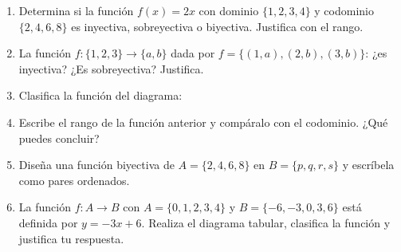 \documentclass[12pt, letterpaper]{article}
\begin{document}
\begin{enumerate}[leftmargin=*, resume]
  \item \facil{} Determina si la función $f(x) = 2x$ con dominio $\{1, 2, 3, 4\}$ y codominio $\{2, 4, 6, 8\}$ es inyectiva, sobreyectiva o biyectiva. Justifica con el rango.

  \item \facil{} La función $f: \{1, 2, 3\} \rightarrow \{a, b\}$ dada por $f = \{(1, a), (2, b), (3, b)\}$: ¿es inyectiva? ¿Es sobreyectiva? Justifica.

  \item \medio{} Clasifica la función del diagrama:
        \begin{center}
        \end{center}

  \item \medio{} Escribe el rango de la función anterior y compáralo con el codominio. ¿Qué puedes concluir?

  \item \dificil{} Diseña una función biyectiva de $A = \{2, 4, 6, 8\}$ en $B = \{p, q, r, s\}$ y escríbela como pares ordenados.

  \item \dificil{} La función $f: A \rightarrow B$ con $A = \{0, 1, 2, 3, 4\}$ y $B = \{-6, -3, 0, 3, 6\}$ está definida por $y = -3x + 6$. Realiza el diagrama tabular, clasifica la función y justifica tu respuesta.
\end{enumerate}
\end{document}
